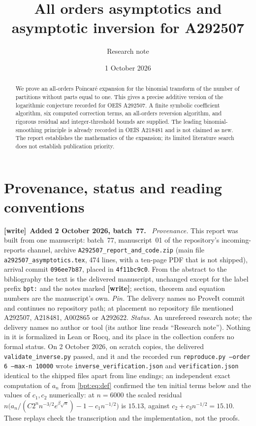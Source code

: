 \documentclass[11pt]{article}
\title{All orders asymptotics and asymptotic inversion for A292507}
\author{Research note}
\date{1 October 2026}
\theoremstyle{remark}\newtheorem{remark}[theorem]{Remark}
\newenvironment{writenote}[1][]{\par\smallskip\begingroup\small
 \noindent\textbf{[write]}\if\relax\detokenize{#1}\relax\else~\textbf{#1.}\fi\ }%
 {\par\endgroup\smallskip}
\begin{document}
\maketitle
\begin{abstract}
We prove an all-orders Poincar\'e expansion for the binomial transform of the number of partitions without parts equal to one. This gives a precise additive version of the logarithmic conjecture recorded for OEIS A292507. A finite symbolic coefficient algorithm, six computed correction terms, an all-orders reversion algorithm, and rigorous residual and integer-threshold bounds are supplied. The leading binomial-smoothing principle is already recorded in OEIS A218481 and is not claimed as new. The report establishes the mathematics of the expansion; its limited literature search does not establish publication priority.
\end{abstract}

\section*{Provenance, status and reading conventions}\label{bpt:provenance}

\begin{writenote}[Added 2 October 2026, batch~77]
\emph{Provenance.} This report was built from one manuscript: batch~77,
manuscript~01 of the repository's incoming-reports channel, archive
\nolinkurl{A292507_report_and_code.zip} (main file
\nolinkurl{a292507_asymptotics.tex}, 474 lines, with a ten-page PDF that is
not shipped), arrival commit \texttt{096ee7b87}, placed in
\texttt{4f11bc9c0}. From the abstract to the bibliography the text is the
delivered manuscript, unchanged except for the label prefix \texttt{bpt:} and
the notes marked \textbf{[write]}; section, theorem and equation numbers are
the manuscript's own.
\emph{Pin.} The delivery names no ProveIt commit and continues no repository
path; at placement no repository file mentioned A292507, A218481, A002865 or
A292622.
\emph{Status.} An unrefereed research note; the delivery names no author or
tool (its author line reads ``Research note''). Nothing in it is formalized
in Lean or Rocq, and its place in the collection confers no formal status.
On 2 October 2026, on scratch copies, the delivered
\texttt{validate\_inverse.py} passed, and it and the recorded run
\texttt{reproduce.py --order 6 --max-n 10000} wrote
\texttt{inverse\_verification.json} and \texttt{verification.json}
identical to the shipped files apart from line endings; an independent
exact computation of
$a_n$ from \eqref{bpt:eq:def} confirmed the ten initial terms below and the
values of $c_1,c_2$ numerically: at $n=6000$ the scaled residual
$n\bigl(a_n/(C2^nn^{-3/2}e^{\beta\sqrt n})-1-c_1n^{-1/2}\bigr)$ is $15.13$,
against $c_2+c_3n^{-1/2}=15.10$. These replays check the
transcription and the implementation, not the proofs.
\end{writenote}
\end{document}
